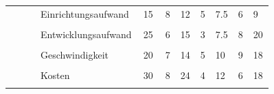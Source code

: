 \documentclass[main.tex]{subfiles} %
\begin{document}
\begin{landscape}
\begin{table}[ht]
\begin{tabular}{|p{0.11\linewidth}|p{0.18\linewidth}|p{0.085\linewidth}|p{0.057\linewidth}|p{0.07\linewidth}|p{0.057\linewidth}|p{0.07\linewidth}|p{0.057\linewidth}|p{0.07\linewidth}|}
                                                      & Einrichtungsaufwand                 & 15                                         & 8                                         & 12                                         & 5          & 7.5         & 6          & 9           \\[1pt]
            \cline{2-9}
                                                      &                                     &                                            &                                           &                                            &            &             &            &             \\[-9pt]
                                                      & Entwicklungsaufwand                 & 25                                         & 6                                         & 15                                         & 3          & 7.5         & 8          & 20          \\[1pt]
            \cline{2-9}
                                                      &                                     &                                            &                                           &                                            &            &             &            &             \\[-9pt]
                                                      & Geschwindigkeit                     & 20                                         & 7                                         & 14                                         & 5          & 10          & 9          & 18          \\[1pt]
            \cline{2-9}
                                                      &                                     &                                            &                                           &                                            &            &             &            &             \\[-9pt]
                                                      & Kosten                              & 30                                         & 8                                         & 24                                         & 4          & 12          & 6          & 18          \\[1pt]
            \cline{2-9}
                                                      &                                     &                                            &                                           &                                            &            &             &            &             \\[-9pt]

\end{tabular}
\end{table}
\end{landscape}
\end{document}
